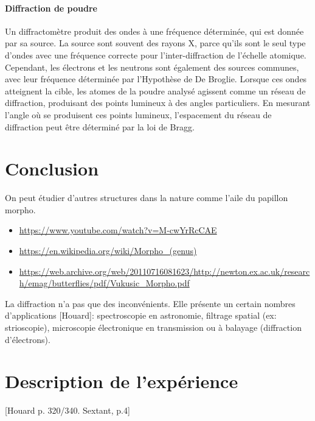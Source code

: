 \documentclass[11pt]{report}
\numberwithin{figure}{section}
\numberwithin{equation}{section}
\numberwithin{table}{section}
\newcommand{\1}{\boldsymbol{1}}
\begin{document}
\paragraph{Diffraction de poudre} Un diffractomètre produit des ondes à une fréquence déterminée, qui est donnée par sa source. La source sont souvent des rayons X, parce qu'ils sont le seul type d'ondes avec une fréquence correcte pour l'inter-diffraction de l'échelle atomique. Cependant, les électrons et les neutrons sont également des sources communes, avec leur fréquence déterminée par l'Hypothèse de De Broglie. Lorsque ces ondes atteignent la cible, les atomes de la poudre analysé agissent comme un réseau de diffraction, produisant des points lumineux à des angles particuliers. En mesurant l'angle où se produisent ces points lumineux, l'espacement du réseau de diffraction peut être déterminé par la loi de Bragg. 

\section*{Conclusion}
  
On peut étudier d'autres structures dans la nature comme l'aile du papillon morpho. 

\begin{itemize}
\item \url{https://www.youtube.com/watch?v=M-cwYrRcCAE}
\item \url{https://en.wikipedia.org/wiki/Morpho_(genus)}
\item \url{https://web.archive.org/web/20110716081623/http://newton.ex.ac.uk/research/emag/butterflies/pdf/Vukusic_Morpho.pdf}
\end{itemize}

La diffraction n'a pas que des inconvénients. Elle présente un certain nombres d'applications [Houard]: spectroscopie en astronomie, filtrage spatial (ex: strioscopie), microscopie électronique en transmission ou à balayage (diffraction d'électrons).



\section*{Description de l'expérience}

[Houard p. 320/340. Sextant, p.4]
\end{document}
